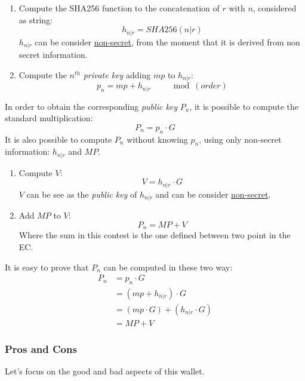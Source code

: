 \begin{enumerate}[label=(\roman*)]
	\item Compute the SHA256 function to the concatenation of $r$ with $n$, considered as string:
	\begin{equation*}
	h_{n|r}=SHA256 (n|r)
	\end{equation*}
	$h_{n|r}$ can be consider \underline{non-secret}, from the moment that it is derived from non secret information.
	\item Compute the $n^{th}$ \textit{private key} adding $mp$ to $h_{n|r}$:
	\begin{equation*}
	p_n=mp+h_{n|r} \qquad \mod (order)
	\end{equation*}
\end{enumerate}
In order to obtain the corresponding \textit{public key} $P_n$, it is possible to compute the standard multiplication:
\begin{equation*}
P_n=p_n \cdot G
\end{equation*}
It is also possible to compute $P_n$ without knowing $p_n$, using only non-secret information: $h_{n|r}$ and $MP$.
\begin{enumerate}[label=(\roman*)]
	\item Compute $V$:
	\begin{equation*}
	V=h_{n|r} \cdot G
	\end{equation*}
	$V$ can be see as the \textit{public key} of $h_{n|r}$ and can be consider \underline{non-secret}.
	\item Add $MP$ to $V$:
	\begin{equation*}
	P_n=MP+V
	\end{equation*}
	Where the sum in this contest is the one defined between two point in the EC.
\end{enumerate}
It is easy to prove that $P_n$ can be computed in these two way:
\begin{equation*} \label{eq1}
\begin{split}
P_n & = p_n \cdot G \\
& = (mp+h_{n|r}) \cdot G \\
& = (mp \cdot G) + (h_{n|r}\cdot G) \\
& = MP + V
\end{split}
\end{equation*}

\subsubsection{Pros and Cons}
Let's focus on the good and bad aspects of this wallet.

